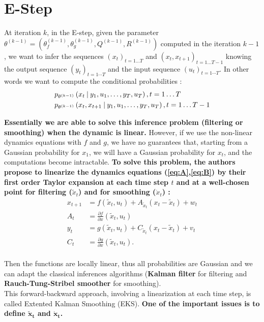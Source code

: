 \section{E-Step}

At iteration $k$, in the E-step, given the parameter $\theta^{(k-1)} = \left( \theta_f^{(k-1)}, \theta_g^{(k-1)}, Q^{(k-1)}, R^{(k-1)} \right)$ computed in the iteration $k-1$, we want to infer the sequences $(x_t)_{t=1 \ldots T}$ and $(x_t, x_{t+1})_{t=1 \ldots T-1}$ knowing the output sequence $(y_t)_{t=1 \cdots T}$ and the input sequence $(u_t)_{t=1 \cdots T}$.
In other words we want to compute the conditional probabilities :
\begin{align*}
  &p_{\theta^{(k-1)}}\left(x_t \mathbin{\vert} y_1, u_1, \ldots, y_T, u_T \right), t=1 \ldots T\\
  &p_{\theta^{(k-1)}}\left(x_t, x_{t+1} \mathbin{\vert} y_1, u_1, \ldots, y_T, u_T \right), t=1 \ldots T-1\\
\end{align*}

\textbf{Essentially we are able to solve this inference problem (filtering or smoothing) when the dynamic is linear.}
However,  if we use the non-linear dynamics equations with $f$ and $g$, we have no guarantees that, starting from a Gaussian probability for $x_1$, we will have a Gaussian probability for $x_{t}$, and the computations become intractable.
\textbf{To solve this problem, the authors propose to linearize the dynamics equations (\ref{eq:A},\ref{eq:B}) by their first order Taylor expansion at each time step $t$ and at a well-chosen point for filtering ($\tilde{x}_t$) and for smoothing ($\dot{x}_t$) :}
\begin{align*}
  x_{t+1} &= f(\tilde{x}_t, u_t) + A_{\tilde{x}_t} (x_t - \tilde{x}_t) + w_t\\
  A_t &= \frac{\partial f}{\partial x}(\tilde{x}_t, u_t)\\
  y_t &= g(\tilde{x}_t, u_t) + C_{\tilde{x}_t} (x_t - \tilde{x}_t) + v_t\\
  C_t &= \frac{\partial g}{\partial x}(\tilde{x}_t, u_t).\\
\end{align*}

Then the functions are locally linear, thus all probabilities are Gaussian and we can adapt the classical inferences algorithms (\textbf{Kalman filter} for filtering and \textbf{Rauch-Tung-Stribel smoother} for smoothing).\\

This forward-backward approach, involving a linearization at each time step, is called Extented Kalman Smoothing (EKS).
\textbf{One of the important issues is to define $\mathbf{\tilde{x}_t}$ and $\mathbf{\dot{x}_t}$.}


